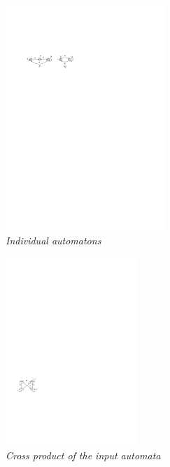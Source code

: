 \begin{figure}
\begin{center}
\includegraphics[width=60mm]{example_1.pdf}
\end{center}
\caption{{\em Individual automatons}} \label{fig1}
\end{figure}

 \begin{figure}
\begin{center}
\includegraphics[width=50mm]{product.pdf}
\end{center}
\caption{{\em Cross product of the input automata}}
\label{product}
\end{figure}
 
